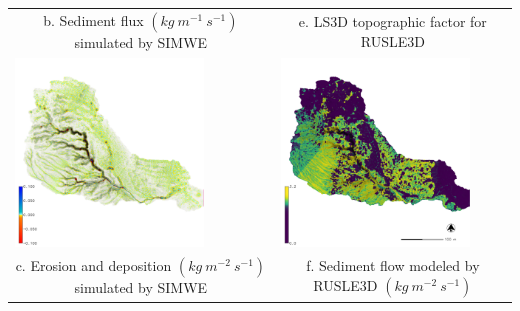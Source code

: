 \documentclass{standalone}
\begin{document}
\begin{tabular}{m{} m{}}
\multicolumn{1}{c}{b. Sediment flux $(kg~m^{-1}~s^{-1})$ simulated by SIMWE}&
\multicolumn{1}{c}{e. LS3D topographic factor for RUSLE3D}\\
\includegraphics[height=50mm,center]{../../images/sample_data/erosion_deposition_2016.png}&
\includegraphics[height=50mm,center]{../../images/sample_data/sediment_flow_2016_carto.png}\\
\multicolumn{1}{c}{c. Erosion and deposition $(kg~m^{-2}~s^{-1})$ simulated by SIMWE}&
\multicolumn{1}{c}{f. Sediment flow modeled by RUSLE3D $(kg ~ m^{-2} ~ s^{-1})$}\\
%
\end{tabular}
\end{document}
